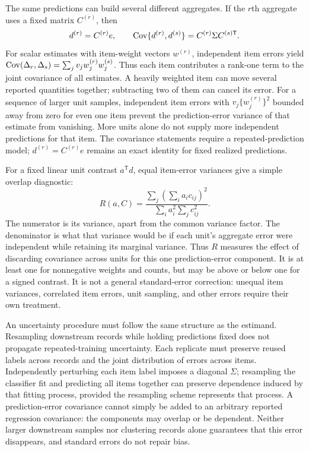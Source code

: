 The same predictions can build several different aggregates. If the $r$th
aggregate uses a fixed matrix $C^{(r)}$, then
\begin{equation}\label{eq:crossaggregate}
 d^{(r)}=C^{(r)}e,\qquad
 \operatorname{Cov}\{d^{(r)},d^{(s)}\}=C^{(r)}\Sigma C^{(s)\mathsf T}.
\end{equation}
For scalar estimates with item-weight vectors $w^{(r)}$, independent item
errors yield
$\operatorname{Cov}(\Delta_r,\Delta_s)=\sum_jv_jw_j^{(r)}w_j^{(s)}$.
Thus each item contributes a rank-one term to the joint covariance of all
estimates. A heavily weighted item can move several reported quantities
together; subtracting two of them can cancel its error. For a sequence of
larger unit samples, independent item errors with
$v_j\{w_j^{(r)}\}^2$ bounded away from zero for even one item prevent the
prediction-error variance of that estimate from vanishing. More units alone
do not supply more independent predictions for that item. The covariance
statements require a repeated-prediction model; $d^{(r)}=C^{(r)}e$ remains an
exact identity for fixed realized predictions.

For a fixed linear unit contrast $a^{\mathsf T}d$, equal item-error variances
give a simple overlap diagnostic:
\begin{equation}\label{eq:overlapratio}
 R(a,C)=
 \frac{\sum_j(\sum_i a_i c_{ij})^2}
      {\sum_i a_i^2\sum_jc_{ij}^2}.
\end{equation}
The numerator is its variance, apart from the common variance factor. The
denominator is what that variance would be if each unit's aggregate error
were independent while retaining its marginal variance. Thus $R$ measures
the effect of discarding covariance across units for this one prediction-error
component. It is at least one for nonnegative weights and counts, but may be
above or below one for a signed contrast. It is not a general standard-error
correction: unequal item variances, correlated item errors, unit sampling,
and other errors require their own treatment.

An uncertainty procedure must follow the same structure as the estimand.
Resampling downstream records while holding predictions fixed does not propagate
repeated-training uncertainty. Each replicate must preserve reused labels across
records and the joint distribution of errors across items. Independently
perturbing each item label imposes a diagonal $\Sigma$; resampling the classifier
fit and predicting all items together can preserve dependence induced by that
fitting process, provided the resampling scheme represents that process.
A prediction-error covariance cannot simply be added to an arbitrary reported
regression covariance: the components may overlap or be dependent. Neither
larger downstream samples nor clustering records alone guarantees that this error
disappears,
and standard errors do not repair bias.

